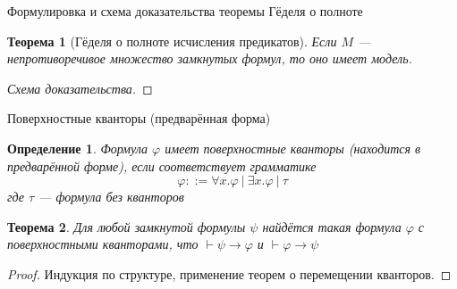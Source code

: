 \documentclass[aspectratio=169]{beamer}
\newtheorem{thm}{Теорема}[section]
\newtheorem{dfn}{Определение}[section]
\begin{document}
\begin{frame}{Формулировка и схема доказательства теоремы Гёделя о полноте}

\begin{thm}[Гёделя о полноте исчисления предикатов]
Если $M$ --- непротиворечивое множество замкнутых формул, то оно имеет модель.
\end{thm}
\begin{proof}[Схема доказательства]
\end{proof}
\end{frame}

\begin{frame}{Поверхностные кванторы (предварённая форма)}
\begin{dfn}
Формула $\varphi$ имеет поверхностные кванторы (находится в предварённой форме), если
соответствует грамматике
$$\varphi ::= \forall x.\varphi\ |\ \exists x.\varphi\ |\ \tau$$
где $\tau$ --- формула без кванторов
\end{dfn}\pause
\begin{thm}
Для любой замкнутой формулы $\psi$ найдётся такая формула $\varphi$ с поверхностными кванторами,
что $\vdash \psi\to\varphi$ и $\vdash\varphi\to\psi$
\end{thm}
\begin{proof}Индукция по структуре, применение теорем о перемещении кванторов.
\end{proof}
\end{frame}
\end{document}
